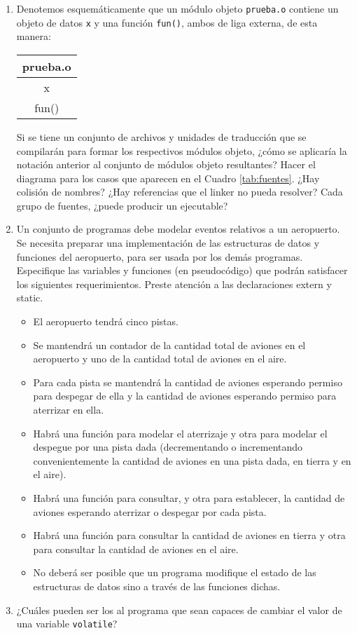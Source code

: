 \begin{enumerate}
\item Denotemos esquemáticamente que un módulo objeto \texttt{prueba.o} contiene un objeto de datos
\texttt{x} y una función \texttt{fun()}, ambos de liga externa, de esta manera:


\begin{tabular}{|c|}
\hline
prueba.o\\
\hline
x\\
fun()\\
\hline
\end{tabular}

Si se tiene un conjunto de archivos y unidades de traducción que se compilarán para formar los
respectivos módulos objeto, ¿cómo se aplicaría la notación anterior al conjunto de módulos objeto
resultantes? Hacer el diagrama para los casos que aparecen en el Cuadro \ref{tab:fuentes}. ¿Hay colisión de nombres? ¿Hay referencias que el linker no pueda resolver? Cada grupo de fuentes, ¿puede producir un ejecutable?

\item  Un conjunto de programas debe modelar eventos relativos a un aeropuerto. Se necesita preparar una
implementación de las estructuras de datos y funciones del aeropuerto, para ser usada por los demás
programas. Especifique las variables y funciones (en pseudocódigo) que podrán satisfacer los
siguientes requerimientos. Preste atención a las declaraciones extern y static.
\begin{itemize}
	\item El aeropuerto tendrá cinco pistas.
\item Se mantendrá un contador de la cantidad total de aviones en el aeropuerto y uno de la cantidad
total de aviones en el aire.
\item Para cada pista se mantendrá la cantidad de aviones esperando permiso para despegar de ella y la
cantidad de aviones esperando permiso para aterrizar en ella.
\item Habrá una función para modelar el aterrizaje y otra para modelar el despegue por una pista dada
(decrementando o incrementando convenientemente la cantidad de aviones en una pista dada, en
tierra y en el aire).
\item Habrá una función para consultar, y otra para establecer, la cantidad de aviones esperando
aterrizar o despegar por cada pista.
\item Habrá una función para consultar la cantidad de aviones en tierra y otra para consultar la cantidad
de aviones en el aire.
\item No deberá ser posible que un programa modifique el estado de las estructuras de datos sino a
través de las funciones dichas.
\end{itemize}
\item ¿Cuáles pueden ser los  al programa que sean capaces de cambiar el valor de una variable \texttt{volatile}?
\end{enumerate}


